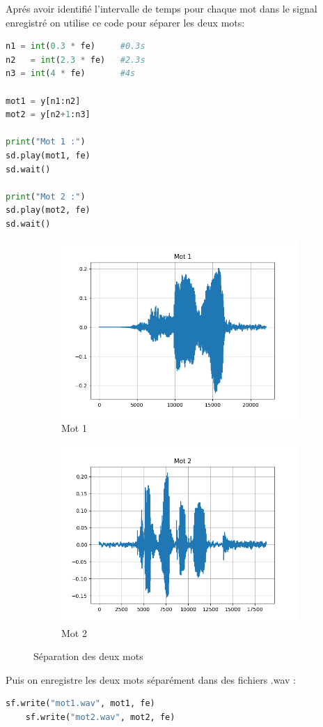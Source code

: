 Aprés avoir identifié l'intervalle de temps pour chaque mot dans le signal enregistré on utilise ce code pour séparer les deux mots:
\begin{lstlisting}[language=python]
n1 = int(0.3 * fe)     #0.3s 
n2   = int(2.3 * fe)   #2.3s 
n3 = int(4 * fe)       #4s 

mot1 = y[n1:n2]
mot2 = y[n2+1:n3]

print("Mot 1 :")
sd.play(mot1, fe)
sd.wait()

print("Mot 2 :")
sd.play(mot2, fe)
sd.wait()
\end{lstlisting}

\begin{figure}[h]
    \centering
    \begin{subfigure}[b]{0.45\textwidth}
        \centering
        \includegraphics[width=9cm]{screenshots/mot1_graphe.png}
        \caption{Mot 1}
        \label{fig:mot1}
    \end{subfigure}
    \hfill
    \begin{subfigure}[b]{0.45\textwidth}
        \centering
        \includegraphics[width=9cm]{screenshots/mot2_graphe.png}
        \caption{Mot 2}
        \label{fig:mot2}
    \end{subfigure}
    \caption{Séparation des deux mots}
    \label{fig:Séparation des deux mots}
\end{figure}

Puis on enregistre les deux mots séparément dans des fichiers .wav :
\begin{lstlisting}[language=python]
    sf.write("mot1.wav", mot1, fe)
    sf.write("mot2.wav", mot2, fe)
\end{lstlisting}
